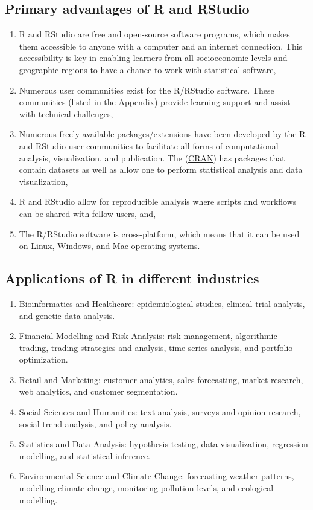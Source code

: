 \documentclass[
  letterpaper,
  DIV=11,
  numbers=noendperiod]{scrreprt}
\begin{document}
\subsection{Primary advantages of R and
RStudio}\label{primary-advantages-of-r-and-rstudio}

\begin{enumerate}
\def\labelenumi{\roman{enumi}.}
\item
  R and RStudio are free and open-source software programs, which makes
  them accessible to anyone with a computer and an internet connection.
  This accessibility is key in enabling learners from all socioeconomic
  levels and geographic regions to have a chance to work with
  statistical software,
\item
  Numerous user communities exist for the R/RStudio software. These
  communities (listed in the Appendix) provide learning support and
  assist with technical challenges,
\item
  Numerous freely available packages/extensions have been developed by
  the R and RStudio user communities to facilitate all forms of
  computational analysis, visualization, and publication. The
  (\href{https://cran.r-project.org/}{CRAN}) has packages that contain
  datasets as well as allow one to perform statistical analysis and data
  visualization,
\item
  R and RStudio allow for reproducible analysis where scripts and
  workflows can be shared with fellow users, and,
\item
  The R/RStudio software is cross-platform, which means that it can be
  used on Linux, Windows, and Mac operating systems.
\end{enumerate}

\subsection{Applications of R in different
industries}\label{applications-of-r-in-different-industries}

\begin{enumerate}
\def\labelenumi{\roman{enumi}.}
\item
  Bioinformatics and Healthcare: epidemiological studies, clinical trial
  analysis, and genetic data analysis.
\item
  Financial Modelling and Risk Analysis: risk management, algorithmic
  trading, trading strategies and analysis, time series analysis, and
  portfolio optimization.
\item
  Retail and Marketing: customer analytics, sales forecasting, market
  research, web analytics, and customer segmentation.
\item
  Social Sciences and Humanities: text analysis, surveys and opinion
  research, social trend analysis, and policy analysis.
\item
  Statistics and Data Analysis: hypothesis testing, data visualization,
  regression modelling, and statistical inference.
\item
  Environmental Science and Climate Change: forecasting weather
  patterns, modelling climate change, monitoring pollution levels, and
  ecological modelling.
\end{enumerate}
\end{document}
